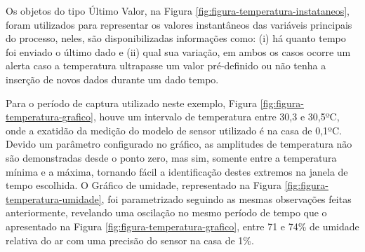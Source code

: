         \begin{figure}[!h]
    	\end{figure}
    	
Os objetos do tipo Último Valor, na Figura \ref{fig:figura-temperatura-instataneos}, foram utilizados para representar os valores instantâneos das variáveis principais do processo, neles, são disponibilizadas informações como: (i)  há quanto tempo foi enviado o último dado e (ii) qual sua variação, em ambos os casos ocorre um alerta caso a temperatura ultrapasse um valor pré-definido ou não tenha a inserção de novos dados durante um dado tempo.

        \begin{figure}[!h]
    	\end{figure}
    	
Para o período de captura utilizado neste exemplo, Figura \ref{fig:figura-temperatura-grafico}, houve um intervalo de temperatura entre 30,3 e 30,5ºC, onde a exatidão da medição do modelo de sensor utilizado é na casa de 0,1ºC. Devido um parâmetro configurado no gráfico, as amplitudes de temperatura não são demonstradas desde o ponto zero, mas sim, somente entre a temperatura mínima e a máxima, tornando fácil a identificação destes extremos na janela de tempo escolhida. O Gráfico de umidade, representado na Figura \ref{fig:figura-temperatura-umidade}, foi parametrizado seguindo as mesmas observações feitas anteriormente, revelando uma oscilação no mesmo período de tempo que o apresentado na Figura \ref{fig:figura-temperatura-grafico}, entre 71 e 74\% de umidade relativa do ar com uma precisão do sensor na casa de 1\%.

